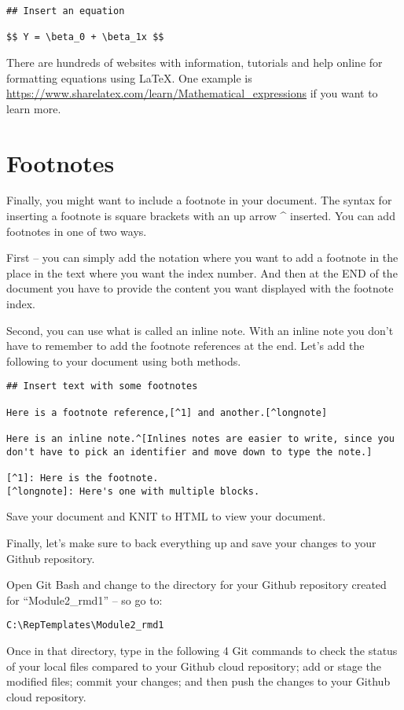 \documentclass[]{book}
\theoremstyle{definition}
\theoremstyle{definition}
\theoremstyle{definition}
\theoremstyle{remark}
\begin{document}
\begin{verbatim}
## Insert an equation

$$ Y = \beta_0 + \beta_1x $$
\end{verbatim}

There are hundreds of websites with information, tutorials and help
online for formatting equations using LaTeX. One example is
\url{https://www.sharelatex.com/learn/Mathematical_expressions} if you
want to learn more.

\section{Footnotes}\label{footnotes}

Finally, you might want to include a footnote in your document. The
syntax for inserting a footnote is square brackets with an up arrow \^{}
inserted. You can add footnotes in one of two ways.

First -- you can simply add the notation where you want to add a
footnote in the place in the text where you want the index number. And
then at the END of the document you have to provide the content you want
displayed with the footnote index.

Second, you can use what is called an inline note. With an inline note
you don't have to remember to add the footnote references at the end.
Let's add the following to your document using both methods.

\begin{verbatim}
## Insert text with some footnotes

Here is a footnote reference,[^1] and another.[^longnote]

Here is an inline note.^[Inlines notes are easier to write, since you don't have to pick an identifier and move down to type the note.]

[^1]: Here is the footnote.
[^longnote]: Here's one with multiple blocks.
\end{verbatim}

Save your document and KNIT to HTML to view your document.

Finally, let's make sure to back everything up and save your changes to
your Github repository.

Open Git Bash and change to the directory for your Github repository
created for ``Module2\_rmd1'' -- so go to:

\texttt{C:\textbackslash{}RepTemplates\textbackslash{}Module2\_rmd1}

Once in that directory, type in the following 4 Git commands to check
the status of your local files compared to your Github cloud repository;
add or stage the modified files; commit your changes; and then push the
changes to your Github cloud repository.
\end{document}
